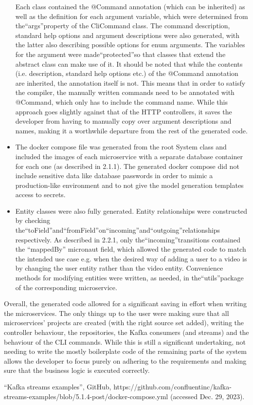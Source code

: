 \documentclass[parskip=full]{article}
\begin{document}
\begin{itemize}
Each class contained the @Command annotation (which can be inherited) as well as the definition for each argument variable, which were determined from the``args''property of the CliCommand class.
The command description, standard help options and argument descriptions were also generated, with the latter also describing possible options for enum arguments.
The variables for the argument were made``protected''so that classes that extend the abstract class can make use of it.
It should be noted that while the contents (i.e. description, standard help options etc.) of the @Command annotation are inherited, the annotation itself is not.
This means that in order to satisfy the compiler, the manually written commands need to be annotated with @Command, which only has to include the command name.
While this approach goes slightly against that of the HTTP controllers, it saves the developer from having to manually copy over argument descriptions and names, making it a worthwhile departure from the rest of the generated code.
\item	The docker compose file was generated from the root System class and included the images of each microservice with a separate database container for each one (as described in 2.1.1).
The generated docker compose did not include sensitive data like database passwords in order to mimic a production-like environment and to not give the model generation templates access to secrets.
\item	Entity classes were also fully generated.
Entity relationships were constructed by checking the``toField''and``fromField''on``incoming''and``outgoing''relationships respectively.
As described in 2.2.1, only the``incoming''transitions contained the ``mappedBy'' micronaut field, which allowed the generated code to match the intended use case e.g. when the desired way of adding a user to a video is by changing the user entity rather than the video entity.
Convenience methods for modifying entities were written, as needed, in the``utils''package of the corresponding microservice.
    \end{itemize}

Overall, the generated code allowed for a significant saving in effort when writing the microservices.
The only things up to the user were making sure that all microservices' projects are created (with the right source set added), writing the controller behaviour, the repositories, the Kafka consumers (and streams) and the behaviour of the CLI commands.
While this is still a significant undertaking, not needing to write the mostly boilerplate code of the remaining parts of the system allows the developer to focus purely on adhering to the requirements and making sure that the business logic is executed correctly.

    \pagebreak
    \begin{thebibliography}{1}
        ``Kafka streams examples'', GitHub, https://github.com/confluentinc/kafka-streams-examples/blob/5.1.4-post/docker-compose.yml (accessed Dec. 29, 2023).
    \end{thebibliography}
\end{document}
